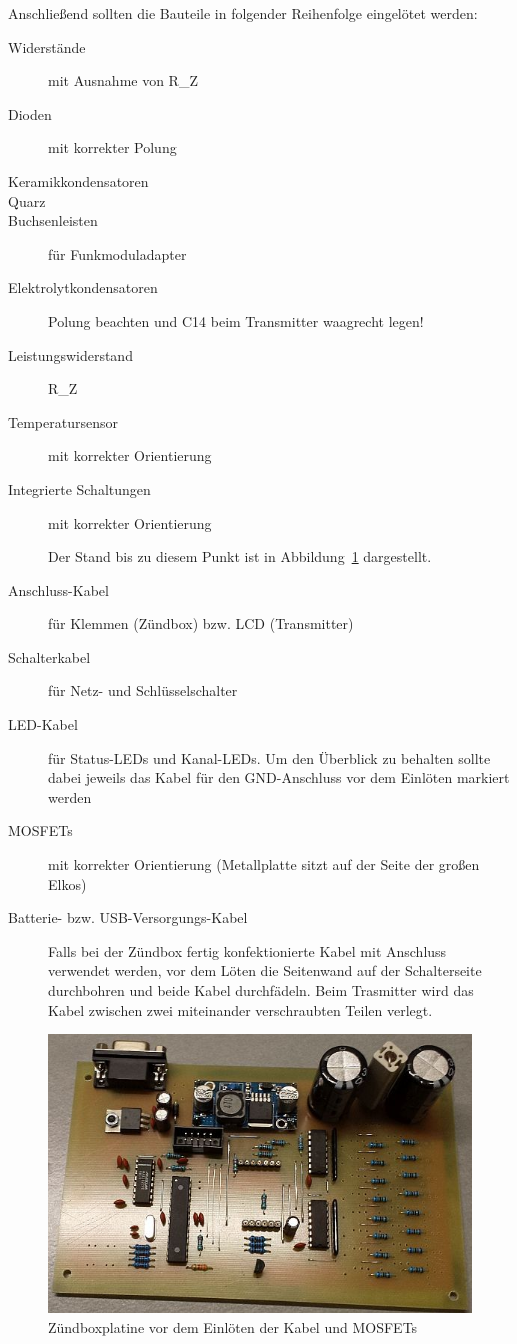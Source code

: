 \documentclass[pdftex, parskip, numbers=noenddot, toc=listof]{scrbook}
\begin{document}
			Anschließend sollten die Bauteile in folgender Reihenfolge eingelötet werden:
			\begin{description}
				\item[Widerstände] mit Ausnahme von R\_Z
				\item[Dioden] mit korrekter Polung
				\item[Keramikkondensatoren]
				\item[Quarz]
				\item[Buchsenleisten] für Funkmoduladapter
				\item[Elektrolytkondensatoren] Polung beachten und C14 beim Transmitter waagrecht legen!
				\item[Leistungswiderstand] R\_Z
				\item[Temperatursensor] mit korrekter Orientierung
				\item[Integrierte Schaltungen] mit korrekter Orientierung
				\begin{center}
					Der Stand bis zu diesem Punkt ist in Abbildung~\ref{fig:platinenzwischenschritt} dargestellt.
				\end{center}
				\item[Anschluss-Kabel] für Klemmen (Zündbox) bzw. LCD (Transmitter)
				\item[Schalterkabel] für Netz- und Schlüsselschalter
				\item[LED-Kabel] für Status-LEDs und Kanal-LEDs. Um den Überblick zu behalten sollte dabei jeweils das Kabel für den GND-Anschluss vor dem Einlöten markiert werden
				\item[MOSFETs] mit korrekter Orientierung (Metallplatte sitzt auf der Seite der großen Elkos)
				\item[Batterie- bzw. USB-Versorgungs-Kabel] Falls bei der Zündbox fertig konfektionierte Kabel mit Anschluss verwendet werden, vor dem Löten die Seitenwand auf der Schalterseite durchbohren und beide Kabel durchfädeln. Beim Trasmitter wird das Kabel zwischen zwei miteinander verschraubten Teilen verlegt.
			\end{description}

			\begin{figure}
				\centering
				\includegraphics[width=\textwidth]{bilder/platinenzwischenschritt}
				\caption{Zündboxplatine vor dem Einlöten der Kabel und MOSFETs}
				\label{fig:platinenzwischenschritt}
			\end{figure}
\end{document}
